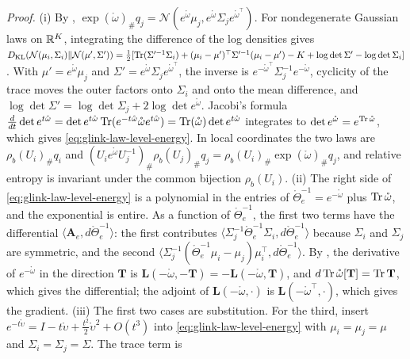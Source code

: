 \noindent\emph{Proof.}
(i) By ,
\(\exp(\mathring\omega)_\#q_j=\mathcal N(e^{\mathring\omega}\mu_j,e^{\mathring\omega}\Sigma_je^{\mathring\omega^\top})\).
For nondegenerate Gaussian laws on \(\mathbb R^K\), integrating the difference of the log densities gives
\(D_{\mathrm{KL}}(\mathcal N(\mu_i,\Sigma_i)\Vert\mathcal N(\mu',\Sigma'))=\tfrac12[\operatorname{Tr}(\Sigma'^{-1}\Sigma_i)+(\mu_i-\mu')^\top\Sigma'^{-1}(\mu_i-\mu')-K+\log\det\Sigma'-\log\det\Sigma_i]\).
With \(\mu'=e^{\mathring\omega}\mu_j\) and \(\Sigma'=e^{\mathring\omega}\Sigma_je^{\mathring\omega^\top}\), the inverse
is \(e^{-\mathring\omega^\top}\Sigma_j^{-1}e^{-\mathring\omega}\), cyclicity of the trace moves the
outer factors onto \(\Sigma_i\) and onto the mean difference, and
\(\log\det\Sigma'=\log\det\Sigma_j+2\log\det e^{\mathring\omega}\). Jacobi's formula
\(\frac{d}{dt}\det e^{t\mathring\omega}=\det e^{t\mathring\omega}\operatorname{Tr}(e^{-t\mathring\omega}\mathring\omega e^{t\mathring\omega})=\operatorname{Tr}(\mathring\omega)\det e^{t\mathring\omega}\)
integrates to \(\det e^{\mathring\omega}=e^{\operatorname{Tr}\mathring\omega}\), which gives
\eqref{eq:glink-law-level-energy}. In local coordinates the two laws are
\(\rho_b(U_i)_\#q_i\) and
\((U_ie^{\mathring\omega}U_j^{-1})_\#\rho_b(U_j)_\#q_j=\rho_b(U_i)_\#\exp(\mathring\omega)_\#q_j\),
and relative entropy is invariant under the common bijection \(\rho_b(U_i)\).
(ii) The right side of \eqref{eq:glink-law-level-energy} is a polynomial in the entries of
\(\mathring\Theta_e^{-1}=e^{-\mathring\omega}\) plus \(\operatorname{Tr}\mathring\omega\), and the exponential is entire. As
a function of \(\mathring\Theta_e^{-1}\), the first two terms have the differential
\(\langle\mathbf A_e,d\mathring\Theta_e^{-1}\rangle\): the first contributes
\(\langle\Sigma_j^{-1}\mathring\Theta_e^{-1}\Sigma_i,d\mathring\Theta_e^{-1}\rangle\) because \(\Sigma_i\) and
\(\Sigma_j\) are symmetric, and the second
\(\langle\Sigma_j^{-1}(\mathring\Theta_e^{-1}\mu_i-\mu_j)\mu_i^\top,d\mathring\Theta_e^{-1}\rangle\). By
, the derivative of \(e^{-\mathring\omega}\) in the direction \(\mathbf T\) is
\(\mathbf L(-\mathring\omega,-\mathbf T)=-\mathbf L(-\mathring\omega,\mathbf T)\), and
\(d\operatorname{Tr}\mathring\omega[\mathbf T]=\operatorname{Tr}\mathbf T\), which gives the differential; the adjoint of
\(\mathbf L(-\mathring\omega,\cdot)\) is \(\mathbf L(-\mathring\omega^\top,\cdot)\), which gives the
gradient. (iii) The first two cases are substitution. For the third, insert
\(e^{-t\mathring\upsilon}=I-t\mathring\upsilon+\tfrac{t^2}2\mathring\upsilon^2+O(t^3)\) into
\eqref{eq:glink-law-level-energy} with \(\mu_i=\mu_j=\mu\) and \(\Sigma_i=\Sigma_j=\Sigma\). The trace term is

